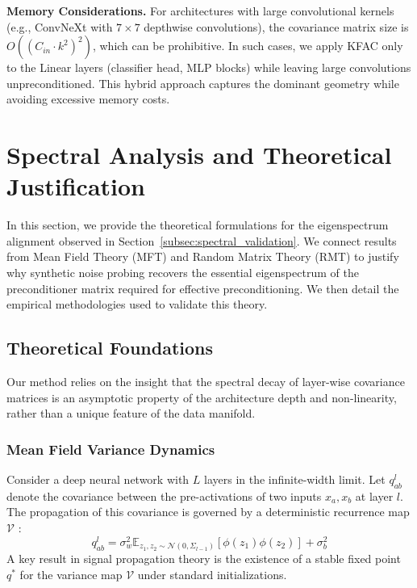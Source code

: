 \documentclass{article}
\theoremstyle{plain}
\theoremstyle{definition}
\theoremstyle{remark}
\begin{document}
\textbf{Memory Considerations.} For architectures with large convolutional kernels (e.g., ConvNeXt with $7 \times 7$ depthwise convolutions), the covariance matrix size is $O((C_{in} \cdot k^2)^2)$, which can be prohibitive. In such cases, we apply KFAC only to the Linear layers (classifier head, MLP blocks) while leaving large convolutions unpreconditioned. This hybrid approach captures the dominant geometry while avoiding excessive memory costs.

\section{Spectral Analysis and Theoretical Justification}
\label{app:spectral_analysis}

In this section, we provide the theoretical formulations for the eigenspectrum alignment observed in Section~\ref{subsec:spectral_validation}. We connect results from Mean Field Theory (MFT) and Random Matrix Theory (RMT) to justify why synthetic noise probing recovers the essential eigenspectrum of the preconditioner matrix required for effective preconditioning. We then detail the empirical methodologies used to validate this theory.

\subsection{Theoretical Foundations}

Our method relies on the insight that the spectral decay of layer-wise covariance matrices is an asymptotic property of the architecture depth and non-linearity, rather than a unique feature of the data manifold.

\subsubsection{Mean Field Variance Dynamics}
Consider a deep neural network with $L$ layers in the infinite-width limit. Let $q^l_{ab}$ denote the covariance between the pre-activations of two inputs $x_a, x_b$ at layer $l$. The propagation of this covariance is governed by a deterministic recurrence map $\mathcal{V}$ \cite{schoenholz2016deep}:
\begin{equation}
    q^l_{ab} = \sigma_w^2 \mathbb{E}_{z_1, z_2 \sim \mathcal{N}(0, \Sigma_{l-1})} [\phi(z_1)\phi(z_2)] + \sigma_b^2
\end{equation}
A key result in signal propagation theory is the existence of a stable fixed point $q^*$ for the variance map $\mathcal{V}$ under standard initializations.
\end{document}
